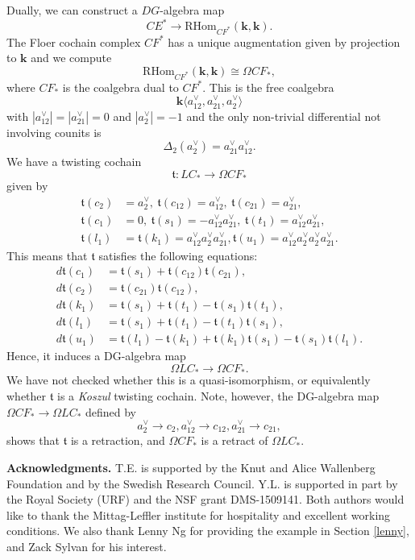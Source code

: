 \documentclass{gtpart}
\renewcommand{\k}{\mathbf{k}}
\renewcommand{\t}{\mathfrak{t}}
\newcommand{\Cobar}{\Omega}
\begin{document}
Dually, we can construct a $DG$-algebra map 
\[ CE^* \to \mathrm{RHom}_{CF^*}(\k,\k). \]
The Floer cochain complex $CF^*$ has a unique augmentation given by projection to $\k$ and we compute 
\[ \mathrm{RHom}_{CF^*}(\k,\k) \cong \Cobar CF_*, \]
where $CF_*$ is the coalgebra dual to $CF^{\ast}$. This is the free coalgebra
\[  \k \langle a^\vee_{12} , a^\vee_{21} , a^\vee_{2} \rangle \] 
with $|a_{12}^\vee|=|a_{21}^\vee|=0$ and $|a^\vee_{2}|=-1$ and the only non-trivial differential not involving counits is
\[ \Delta_{2}(a^\vee_{2}) = a_{21}^\vee a_{12}^\vee. \] 
We have a twisting cochain 
\[ \t\colon LC_* \to \Omega CF_* \]
given by  \begin{align*}
    \t (c_2) &= a^\vee_2,\ \t (c_{12}) = a^\vee_{12},\ \t (c_{21}) = a^\vee_{21},\\
    \t(c_1) &=0,\ \t (s_1) = -a_{12}^\vee a_{21}^\vee ,\ \t (t_1) = a_{12}^\vee a_{21}^\vee,\ \\  \t
    (l_1) &= \t(k_1)=  a_{12}^\vee
    a_2^\vee a_{21}^\vee, \t(u_1) = a_{12}^\vee a_2^\vee a_2^\vee a_{21}^\vee.
\end{align*}
This means that $\t$ satisfies the following equations:
\begin{align*} 
    d\t(c_1) &= \t(s_1) + \t(c_{12}) \t(c_{21}), \\
    d\t(c_2) &= \t(c_{21}) \t(c_{12}), \\
    d\t(k_1) &= \t(s_1) + \t(t_1) - \t(s_1) \t(t_1), \\
    d\t(l_1) &= \t(s_1) + \t(t_1) - \t(t_1) \t(s_1), \\
    d\t(u_1) &= \t(l_1) -\t(k_1) + \t(k_1) \t(s_1) - \t(s_1) \t(l_1).  
\end{align*}
Hence, it induces a DG-algebra map 
\[  \Omega LC_*  \to \Omega  CF_*. \]
We have not checked whether this is a quasi-isomorphism, or equivalently whether $\t$ is a
\emph{Koszul} twisting cochain. Note, however, the DG-algebra map $\Omega CF_* \to \Omega LC_* $ defined by
\[ a_2^\vee \to c_2, a_{12}^\vee \to c_{12}, a_{21}^\vee  \to c_{21}, \]
shows that $\t$ is a retraction, and $\Omega CF_* $ is a retract of $\Omega LC_*$.


\vspace{.5cm}

\noindent
{\bf Acknowledgments.} T.E. is supported by the Knut and Alice Wallenberg Foundation and by the
Swedish Research Council. Y.L. is supported in part by the Royal Society (URF) and the NSF grant
DMS-1509141. Both authors would like to thank the Mittag-Leffler institute for hospitality and
excellent working conditions. We also thank Lenny Ng for providing the example in Section
\ref{lenny}, and Zack Sylvan for his interest. 
\end{document}
